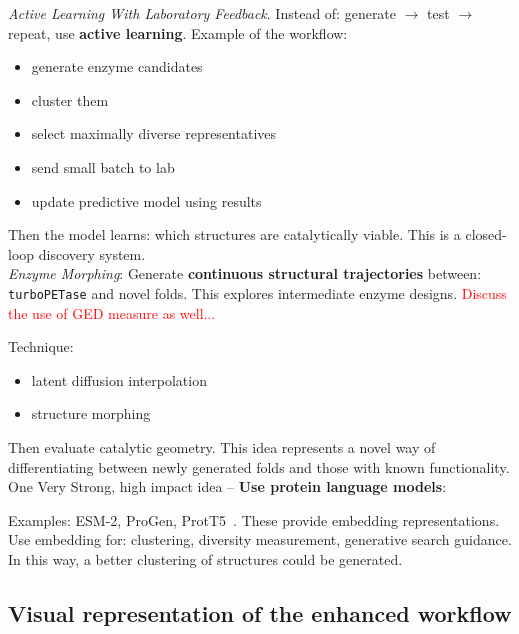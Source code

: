 \documentclass[runningheads]{llncs}
\begin{document}
	 
	
	
	
\textit{Active Learning With Laboratory Feedback}. 
Instead of: generate $\rightarrow$ test $\rightarrow$ repeat, use \textbf{active learning}. Example of the workflow:
\begin{itemize}
	\item generate enzyme candidates
    \item cluster them
    \item select maximally diverse representatives
    \item send small batch to lab
    \item update predictive model using results
\end{itemize}

Then the model learns: which structures are catalytically viable. This is a closed-loop discovery system.\\
	 
	 
\textit{Enzyme Morphing}: Generate \textbf{continuous structural trajectories} between: \texttt{turboPETase} and novel folds. This explores intermediate enzyme designs. \textcolor{red}{Discuss the use of GED measure as well... }

Technique:
\begin{itemize}
	\item latent diffusion interpolation
     \item structure morphing
\end{itemize}

Then evaluate catalytic geometry. This idea represents a novel way of differentiating between newly generated folds and those with known functionality.\\ 


One Very Strong, high impact idea -- \textbf{Use protein language models}: 

Examples: ESM-2, ProGen, ProtT5~\cite{weissenow2022protein}. 
These provide embedding representations. Use embedding for: clustering, diversity measurement, generative search guidance. In this way, a better clustering of structures could be generated. 


\subsection{Visual representation of the enhanced workflow}
\end{document}

